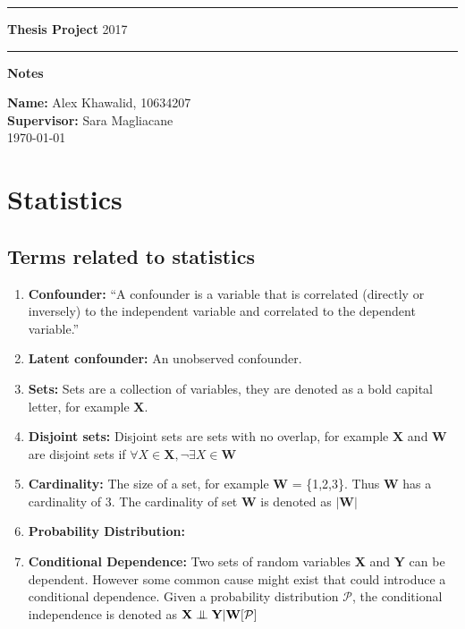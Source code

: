 \documentclass[11pt]{article}
\newcommand{\bigCI}{\mathrel{\text{{$\perp\mkern-10mu\perp$}}}}
\begin{document}
\rule{\textwidth}{1pt}

\textbf{Thesis Project} \hfill 2017
\rule{\textwidth}{1pt}
\vspace*{20pt}


\textbf{Notes}

\textbf{Name:} Alex Khawalid, 10634207\\
\textbf{Supervisor:} Sara Magliacane\\
\today

\section{Statistics}
\subsection{Terms related to statistics}
\begin{enumerate}
    \item \textbf{Confounder:} ``A confounder is a variable that is correlated (directly or inversely) to the independent variable and correlated to the dependent variable.''\cite{wiki:confounding}
    
    \item \textbf{Latent confounder:} An unobserved confounder.
    
    \item \textbf{Sets:} Sets are a collection of variables, they are denoted as a bold capital letter, for example \textbf{X}.
    
    \item \textbf{Disjoint sets:} Disjoint sets are sets with no overlap, for example \textbf{X} and \textbf{W} are disjoint sets if $\forall X \in \textbf{X}, \neg \exists X \in \textbf{W}$
    
    \item \textbf{Cardinality:} The size of a set, for example \textbf{W} = \{1,2,3\}. Thus \textbf{W} has a cardinality of 3. The cardinality of set \textbf{W} is denoted as $\vert \textbf{W} \vert$
    
    \item \textbf{Probability Distribution:}
    
    \item \textbf{Conditional Dependence:} Two sets of random variables \textbf{X} and \textbf{Y} can be dependent. However some common cause might exist that could introduce a conditional dependence. Given a probability distribution $\mathcal{P}$, the conditional independence is denoted as $\textbf{X} \bigCI \textbf{Y} \vert \textbf{W}[\mathcal{P}]$
\end{enumerate}
\end{document}
